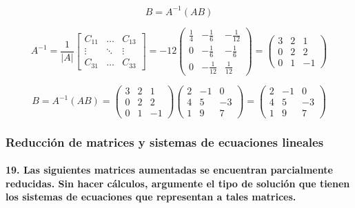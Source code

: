 \documentclass[
]{article}
\begin{document}
\[
B = A^{-1}(AB)
\]

\[
A^{-1} = \frac{1}{|A|} \begin{bmatrix}C_{11} &\dots& C_{13} \\ \vdots &\ddots & \vdots \\ C_{31} & \dots & C_{33} \end{bmatrix} = -12\begin{pmatrix}\frac{1}{4} & -\frac{1}{6} & -\frac{1}{12} \\ 0 & -\frac{1}{6} & - \frac{1}{6} \\ 0& -\frac{1}{12} & \frac{1}{12}\end{pmatrix} = \begin{pmatrix}3&2&1\\0&2&2\\0&1&-1\end{pmatrix}
\]

\[
B = A^{-1}(AB) = \begin{pmatrix}
    3&2&1\\0&2&2\\0&1&-1
\end{pmatrix} \begin{pmatrix}
    2&-1&0\\4&5&-3\\1&9&7
\end{pmatrix} = \begin{pmatrix}
    2&-1&0\\4&5&-3\\1&9&7
\end{pmatrix}
\]

\hypertarget{reducciuxf3n-de-matrices-y-sistemas-de-ecuaciones-lineales}{%
\subsubsection{Reducción de matrices y sistemas de ecuaciones
lineales}\label{reducciuxf3n-de-matrices-y-sistemas-de-ecuaciones-lineales}}

\hypertarget{las-siguientes-matrices-aumentadas-se-encuentran-parcialmente-reducidas.-sin-hacer-cuxe1lculos-argumente-el-tipo-de-soluciuxf3n-que-tienen-los-sistemas-de-ecuaciones-que-representan-a-tales-matrices.}{%
\paragraph{19. Las siguientes matrices aumentadas se encuentran
parcialmente reducidas. Sin hacer cálculos, argumente el tipo de
solución que tienen los sistemas de ecuaciones que representan a tales
matrices.}\label{las-siguientes-matrices-aumentadas-se-encuentran-parcialmente-reducidas.-sin-hacer-cuxe1lculos-argumente-el-tipo-de-soluciuxf3n-que-tienen-los-sistemas-de-ecuaciones-que-representan-a-tales-matrices.}}
\end{document}
